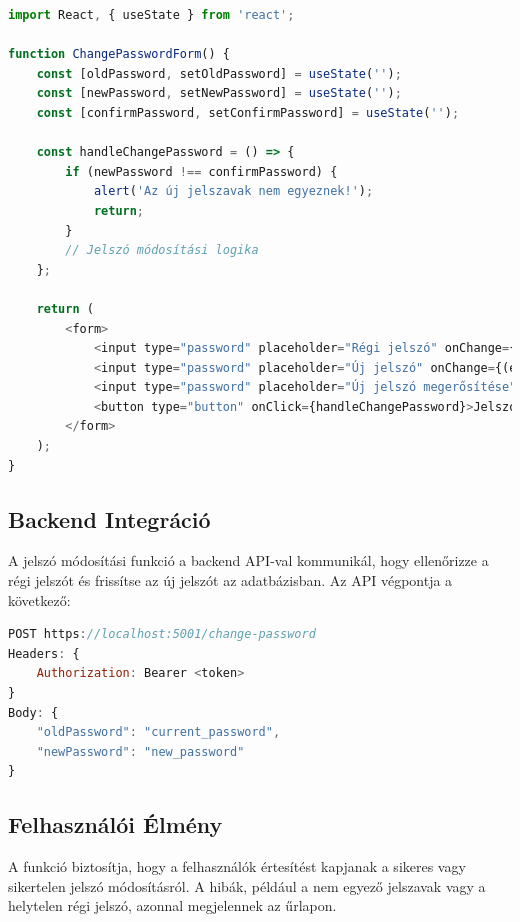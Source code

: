 \documentclass[colorlinks]{thesis-kando}
\theoremstyle{definition}
\theoremstyle{remark}
\begin{document}
\begin{lstlisting}[language=JavaScript]
import React, { useState } from 'react';

function ChangePasswordForm() {
    const [oldPassword, setOldPassword] = useState('');
    const [newPassword, setNewPassword] = useState('');
    const [confirmPassword, setConfirmPassword] = useState('');

    const handleChangePassword = () => {
        if (newPassword !== confirmPassword) {
            alert('Az új jelszavak nem egyeznek!');
            return;
        }
        // Jelszó módosítási logika
    };

    return (
        <form>
            <input type="password" placeholder="Régi jelszó" onChange={(e) => setOldPassword(e.target.value)} />
            <input type="password" placeholder="Új jelszó" onChange={(e) => setNewPassword(e.target.value)} />
            <input type="password" placeholder="Új jelszó megerősítése" onChange={(e) => setConfirmPassword(e.target.value)} />
            <button type="button" onClick={handleChangePassword}>Jelszó módosítása</button>
        </form>
    );
}
\end{lstlisting}

\subsection{Backend Integráció}
A jelszó módosítási funkció a backend API-val kommunikál, hogy ellenőrizze a régi jelszót és frissítse az új jelszót az adatbázisban. Az API végpontja a következő:

\begin{lstlisting}[language=JavaScript]
POST https://localhost:5001/change-password
Headers: {
    Authorization: Bearer <token>
}
Body: {
    "oldPassword": "current_password",
    "newPassword": "new_password"
}
\end{lstlisting}

\subsection{Felhasználói Élmény}
A funkció biztosítja, hogy a felhasználók értesítést kapjanak a sikeres vagy sikertelen jelszó módosításról. A hibák, például a nem egyező jelszavak vagy a helytelen régi jelszó, azonnal megjelennek az űrlapon.
\end{document}
